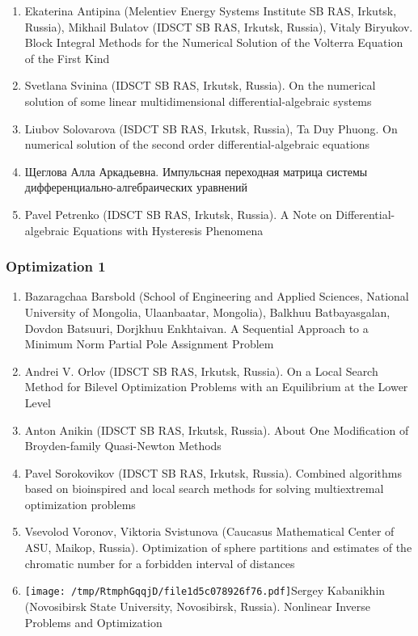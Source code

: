 \documentclass[
]{article}
\providecommand{\tightlist}{%
  \setlength{\itemsep}{0pt}\setlength{\parskip}{0pt}}
\begin{document}
\begin{enumerate}
\def\labelenumi{\arabic{enumi}.}
\tightlist
\item
  Ekaterina Antipina (Melentiev Energy Systems Institute SB RAS,
  Irkutsk, Russia), Mikhail Bulatov (IDSCT SB RAS, Irkutsk, Russia),
  Vitaly Biryukov. Block Integral Methods for the Numerical Solution of
  the Volterra Equation of the First Kind
\item
  Svetlana Svinina (IDSCT SB RAS, Irkutsk, Russia). On the numerical
  solution of some linear multidimensional differential-algebraic
  systems
\item
  Liubov Solovarova (ISDCT SB RAS, Irkutsk, Russia), Ta Duy Phuong. On
  numerical solution of the second order differential-algebraic
  equations
\item
  Щеглова Алла Аркадьевна. Импульсная переходная матрица системы
  дифференциально-алгебраических уравнений
\item
  Pavel Petrenko (IDSCT SB RAS, Irkutsk, Russia). A Note on
  Differential-algebraic Equations with Hysteresis Phenomena
\end{enumerate}

\hypertarget{o1}{%
\subsubsection{Optimization 1}\label{o1}}

\begin{enumerate}
\def\labelenumi{\arabic{enumi}.}
\tightlist
\item
  Bazaragchaa Barsbold (School of Engineering and Applied Sciences,
  National University of Mongolia, Ulaanbaatar, Mongolia), Balkhuu
  Batbayasgalan, Dovdon Batsuuri, Dorjkhuu Enkhtaivan. A Sequential
  Approach to a Minimum Norm Partial Pole Assignment Problem
\item
  Andrei V. Orlov (IDSCT SB RAS, Irkutsk, Russia). On a Local Search
  Method for Bilevel Optimization Problems with an Equilibrium at the
  Lower Level
\item
  Anton Anikin (IDSCT SB RAS, Irkutsk, Russia). About One Modification
  of Broyden-family Quasi-Newton Methods
\item
  Pavel Sorokovikov (IDSCT SB RAS, Irkutsk, Russia). Combined algorithms
  based on bioinspired and local search methods for solving
  multiextremal optimization problems
\item
  Vsevolod Voronov, Viktoria Svistunova (Caucasus Mathematical Center of
  ASU, Maikop, Russia). Optimization of sphere partitions and estimates
  of the chromatic number for a forbidden interval of distances
\item
  \protect\texttt{[image: /tmp/RtmphGqqjD/file1d5c078926f76.pdf]}Sergey
  Kabanikhin (Novosibirsk State University, Novosibirsk, Russia).
  Nonlinear Inverse Problems and Optimization
\end{enumerate}
\end{document}
